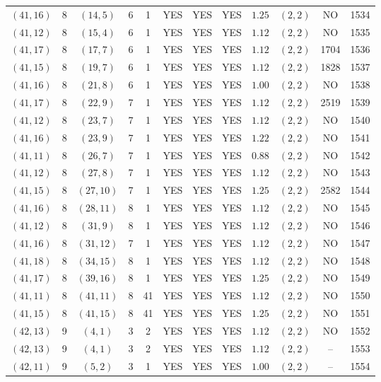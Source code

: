 \begin{longtable}{|c|c|c|c|c|c|c|c|c|c|c|c|}
$(41,16)$ & 8 & $(14,5)$ & 6 & 1 & YES & YES & YES & $1.25$ & $(2,2)$ & NO & 1534\\
$(41,12)$ & 8 & $(15,4)$ & 6 & 1 & YES & YES & YES & $1.12$ & $(2,2)$ & NO & 1535\\
$(41,17)$ & 8 & $(17,7)$ & 6 & 1 & YES & YES & YES & $1.12$ & $(2,2)$ & 1704 & 1536\\
$(41,15)$ & 8 & $(19,7)$ & 6 & 1 & YES & YES & YES & $1.12$ & $(2,2)$ & 1828 & 1537\\
$(41,16)$ & 8 & $(21,8)$ & 6 & 1 & YES & YES & YES & $1.00$ & $(2,2)$ & NO & 1538\\
$(41,17)$ & 8 & $(22,9)$ & 7 & 1 & YES & YES & YES & $1.12$ & $(2,2)$ & 2519 & 1539\\
$(41,12)$ & 8 & $(23,7)$ & 7 & 1 & YES & YES & YES & $1.12$ & $(2,2)$ & NO & 1540\\
$(41,16)$ & 8 & $(23,9)$ & 7 & 1 & YES & YES & YES & $1.22$ & $(2,2)$ & NO & 1541\\
$(41,11)$ & 8 & $(26,7)$ & 7 & 1 & YES & YES & YES & $0.88$ & $(2,2)$ & NO & 1542\\
$(41,12)$ & 8 & $(27,8)$ & 7 & 1 & YES & YES & YES & $1.12$ & $(2,2)$ & NO & 1543\\
$(41,15)$ & 8 & $(27,10)$ & 7 & 1 & YES & YES & YES & $1.25$ & $(2,2)$ & 2582 & 1544\\
$(41,16)$ & 8 & $(28,11)$ & 8 & 1 & YES & YES & YES & $1.12$ & $(2,2)$ & NO & 1545\\
$(41,12)$ & 8 & $(31,9)$ & 8 & 1 & YES & YES & YES & $1.12$ & $(2,2)$ & NO & 1546\\
$(41,16)$ & 8 & $(31,12)$ & 7 & 1 & YES & YES & YES & $1.12$ & $(2,2)$ & NO & 1547\\
$(41,18)$ & 8 & $(34,15)$ & 8 & 1 & YES & YES & YES & $1.12$ & $(2,2)$ & NO & 1548\\
$(41,17)$ & 8 & $(39,16)$ & 8 & 1 & YES & YES & YES & $1.25$ & $(2,2)$ & NO & 1549\\
$(41,11)$ & 8 & $(41,11)$ & 8 & 41 & YES & YES & YES & $1.12$ & $(2,2)$ & NO & 1550\\
$(41,15)$ & 8 & $(41,15)$ & 8 & 41 & YES & YES & YES & $1.25$ & $(2,2)$ & NO & 1551\\
$(42,13)$ & 9 & $(4,1)$ & 3 & 2 & YES & YES & YES & $1.12$ & $(2,2)$ & NO & 1552\\
$(42,13)$ & 9 & $(4,1)$ & 3 & 2 & YES & YES & YES & $1.12$ & $(2,2)$ & -- & 1553\\
$(42,11)$ & 9 & $(5,2)$ & 3 & 1 & YES & YES & YES & $1.00$ & $(2,2)$ & -- & 1554\\

\end{longtable}
